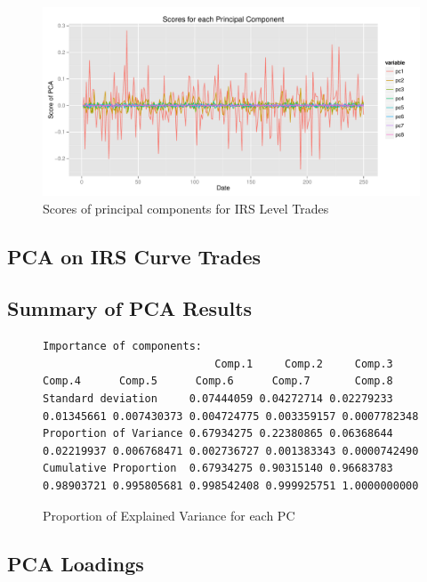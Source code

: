 \begin{figure}[H]
\centering\includegraphics[width=\textwidth]{pca-scores-vanilla.pdf}
\caption{Scores of principal components for IRS Level Trades}
\label{fig:pca-scores-vanilla}
\end{figure}

\begin{landscape}
\chapter{PCA on IRS Curve Trades}
\section{Summary of PCA Results}

\begin{figure}[H]
\begin{lstlisting}
Importance of components:
                           Comp.1     Comp.2     Comp.3     Comp.4      Comp.5      Comp.6      Comp.7       Comp.8
Standard deviation     0.07444059 0.04272714 0.02279233 0.01345661 0.007430373 0.004724775 0.003359157 0.0007782348
Proportion of Variance 0.67934275 0.22380865 0.06368644 0.02219937 0.006768471 0.002736727 0.001383343 0.0000742490
Cumulative Proportion  0.67934275 0.90315140 0.96683783 0.98903721 0.995805681 0.998542408 0.999925751 1.0000000000
\end{lstlisting}
\caption{Proportion of Explained Variance for each PC}
\label{fig:verbatim-curve}
\end{figure}

\end{landscape}

\section{PCA Loadings}

